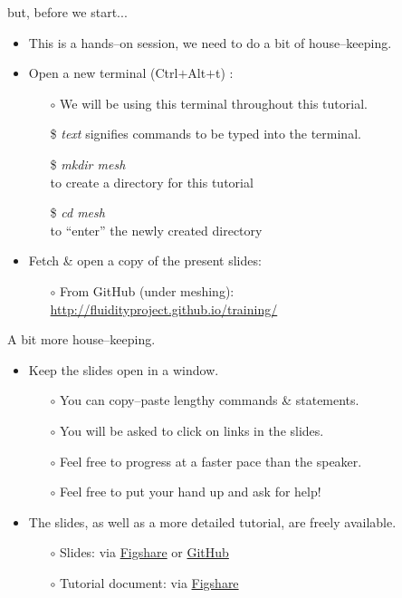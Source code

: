 \documentclass[t]{beamer}
\begin{document}
\begin{frame}{but, before we start...}
  \begin{itemize}
      \item This is a hands--on session, we need to do a bit of house--keeping.
      \vspace{10pt}
      \item Open a new terminal (Ctrl$+$Alt$+$t) :
      \begin{itemize}
         \item[$\circ$] We will be using this terminal throughout this tutorial.
         \item[\$] \emph{text} signifies commands to be typed into the terminal.
         \item[\$] \emph{mkdir mesh} \\to create a directory for this tutorial
         \item[\$] \emph{cd mesh} \\to ``enter'' the newly created directory
      \end{itemize}
      \vspace{10pt}
      \item Fetch \& open a copy of the present slides:
      \begin{itemize}
         \item[$\circ$] From GitHub (under meshing): \url{http://fluidityproject.github.io/training/}
      \end{itemize}
  \end{itemize}
\end{frame}

\begin{frame}{A bit more house--keeping.}
  \begin{itemize}
     \item Keep the slides open in a window.
     \begin{itemize}
         \item[$\circ$] You can copy--paste lengthy commands \& statements.
         \item[$\circ$] You will be asked to click on links in the slides.
         \item[$\circ$] Feel free to progress at a faster pace than the speaker.
         \item[$\circ$] Feel free to put your hand up and ask for help!
     \end{itemize}
     \vspace{10pt}
     \item The slides, as well as a more detailed tutorial, are freely available.\\
     \begin{itemize}
         \item[$\circ$] Slides: via \href{http://figshare.com/s/0dbd16a2635b11e4a71206ec4b8d1f61}{Figshare} or \href{http://fluidityproject.github.io/training/}{GitHub}
         \item[$\circ$] Tutorial document: via \href{http://figshare.com/s/16b14b6c650811e483cb06ec4bbcf141}{Figshare}
     \end{itemize}
  \end{itemize}
\end{frame}
\end{document}
